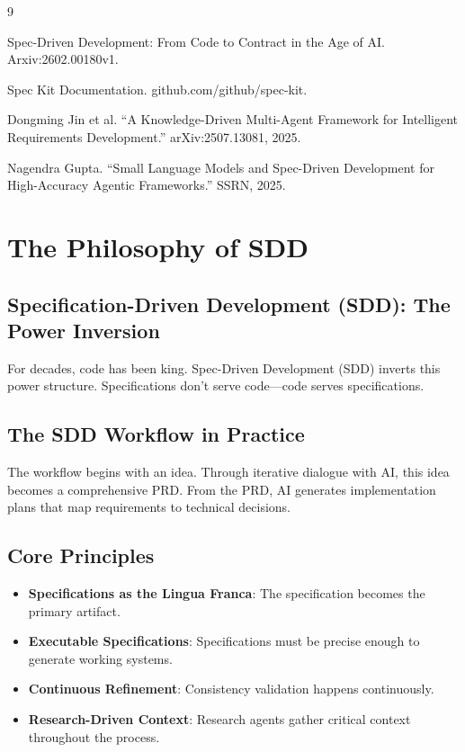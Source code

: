 \documentclass[sigconf,anonymous,review]{acmart}
\begin{document}
\begin{thebibliography}{9}

Spec-Driven Development: From Code to Contract in the Age of AI. Arxiv:2602.00180v1.

Spec Kit Documentation. github.com/github/spec-kit.

Dongming Jin et al. ``A Knowledge-Driven Multi-Agent Framework for Intelligent Requirements Development.'' arXiv:2507.13081, 2025.

Nagendra Gupta. ``Small Language Models and Spec-Driven Development for High-Accuracy Agentic Frameworks.'' SSRN, 2025.

\end{thebibliography}

\appendix

\section{The Philosophy of SDD}

\subsection{Specification-Driven Development (SDD): The Power Inversion}

For decades, code has been king. Spec-Driven Development (SDD) inverts this power structure. Specifications don't serve code---code serves specifications.

\subsection{The SDD Workflow in Practice}

The workflow begins with an idea. Through iterative dialogue with AI, this idea becomes a comprehensive PRD. From the PRD, AI generates implementation plans that map requirements to technical decisions.

\subsection{Core Principles}

\begin{itemize}
  \item \textbf{Specifications as the Lingua Franca}: The specification becomes the primary artifact.
  \item \textbf{Executable Specifications}: Specifications must be precise enough to generate working systems.
  \item \textbf{Continuous Refinement}: Consistency validation happens continuously.
  \item \textbf{Research-Driven Context}: Research agents gather critical context throughout the process.
\end{itemize}
\end{document}
